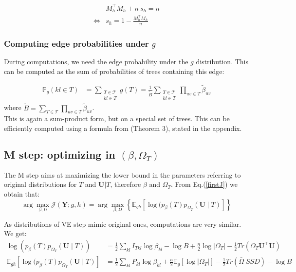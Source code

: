 \documentclass[11pt,a4paper]{article}
\newcommand{\argmax}{\arg\!\max}
\newcommand{\Ybf}{\boldsymbol{Y}}
\newcommand{\Ubf}{\boldsymbol{U}}
\newcommand{\Esp}{\mathds{E}}
\begin{document}
\begin{align*}
& M_h^\intercal M_h+ n\:s_h = n\\
\iff &\boxed{s_h = 1-\frac{ M_h^\intercal M_h}{n}}
\end{align*}

\subsubsection{Computing edge probabilities under $g$}
During computations, we need the edge probability under the $g$ distribution. This can be computed as the sum of probabilities of trees containing this edge:

\begin{align*}
\mathds{P}_g(kl \in T)  &= \sum_{\substack{T  \in \mathcal{T} \\ kl \in T }} g(T) =\frac{1}{\widetilde{B}} \sum_{\substack{T  \in \mathcal{T} \\ kl \in T }} \prod_{uv \in T} \widetilde{\beta}_{uv}
\end{align*}
where $\displaystyle \widetilde{B}= \sum_{T \in \mathcal{T} }\prod_{uv \in T}  \widetilde{\beta}_{uv}$.\\

 This is again a sum-product form, but on a special set of trees. This can be efficiently computed using a formula from \citet{kirshner} (Theorem 3), stated in the appendix.
 
 
 \subsection{M step: optimizing in $(\beta, \Omega_T)$}
 The M step aims at maximizing the lower bound in the parameters referring to original distributions for $T$ and $\Ubf|T$, therefore $\beta$ and $\Omega_T$. From Eq.(\ref{firstJ}) we obtain that: 
$$ \argmax_{\beta, \Omega} \mathcal{J}(\Ybf ; g,h) =\argmax_{\beta, \Omega} \left\{ \Esp_{gh} [\log (p_\beta(T)p_{\Omega_T}(\Ubf\mid T) ]\right\} $$

As distributions of VE step mimic original ones, computations are very similar. We get:
\begin{align*}
\log (p_\beta(T)p_{\Omega_T}(\Ubf\mid T))  &= \frac{1}{2}\sum_{kl} I_{Tkl} \log \beta_{kl} - \log B + \frac{n}{2}\log |\Omega_T| - \frac{1}{2}Tr(\Omega_T \Ubf^\intercal \Ubf)\\
\Esp_{gh} [\log (p_\beta(T)p_{\Omega_T}(\Ubf\mid T) ] &= \frac{1}{2}\sum_{kl} P_{kl} \log\beta_{kl} +\frac{n}{2} \Esp_g[\log |\Omega_T|] -\frac{1}{2} Tr(\bar{\Omega} \; SSD)- \log B
\end{align*}
\end{document}
